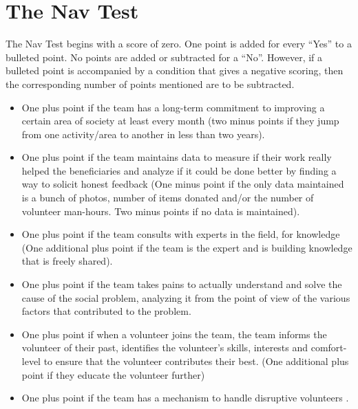 \documentclass[conference]{IEEEtran}
\begin{document}
\section{The Nav Test}
The Nav Test begins with a score of zero. One point is added for every \enquote{Yes} to a bulleted point. No points are added or subtracted for a \enquote{No}. However, if a bulleted point is accompanied by a condition that gives a negative scoring, then the corresponding number of points mentioned are to be subtracted.
\begin{itemize}
\item One plus point if the team has a long-term commitment to improving a certain area of society at least every month (two minus points if they jump from one activity/area to another in less than two years).
\item One plus point if the team maintains data to measure if their work really helped the beneficiaries and analyze if it could be done better by finding a way to solicit honest feedback (One minus point if the only data maintained is a bunch of photos, number of items donated and/or the number of volunteer man-hours. Two minus points if no data is maintained).
\item One plus point if the team consults with experts in the field, for knowledge (One additional plus point if the team is the expert and is building knowledge that is freely shared).
\item One plus point if the team takes pains to actually understand and solve the cause of the social problem, analyzing it from the point of view of the various factors that contributed to the problem.
\item One plus point if when a volunteer joins the team, the team informs the volunteer of their past, identifies the volunteer's skills, interests and comfort-level to ensure that the volunteer contributes their best. (One additional plus point if they educate the volunteer further)
\item One plus point if the team has a mechanism to handle disruptive volunteers \cite{disruptiveVolunteers}.
\end{itemize}
\end{document}
